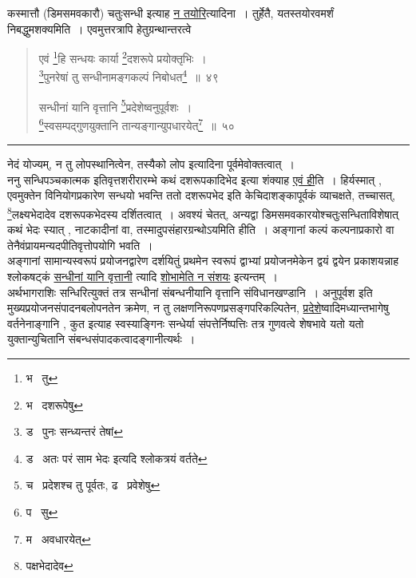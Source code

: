 \documentclass[11pt, openany]{book}
\begin{document}
कस्मात्तौ (डिमसमवकारौ) चतुःसन्धी इत्याह \underline{न तयोरि}त्यादिना~। तुर्हेतै, यतस्तयोरवमर्शं निबद्धुमशक्यमिति~। एवमुत्तरत्रापि हेतुग्रन्थान्तरत्वे \textendash

\newpage

\begin{quote}
{\na एवं \renewcommand{\thefootnote}{1}\footnote{भ \textendash\ तु}हि सन्धयः कार्या \renewcommand{\thefootnote}{2}\footnote{भ \textendash\ दशरूपेषु}दशरूपे प्रयोक्तृभिः~।\\
\renewcommand{\thefootnote}{3}\footnote{ड \textendash\ पुनः सन्ध्यन्तरं तेषां}पुनरेषां तु सन्धीनामङ्गकल्पं निबोधत\renewcommand{\thefootnote}{4}\footnote{ड \textendash\ अतः परं {\qt साम भेदः} इत्यदि श्लोकत्रयं वर्तते}~॥~४९

सन्धीनां यानि वृत्तानि \renewcommand{\thefootnote}{5}\footnote{च \textendash\ प्रदेशश्च तु पूर्वतः, ढ \textendash\ प्रवेशेषु}प्रदेशेष्वनुपूर्वशः~।\\
\renewcommand{\thefootnote}{6}\footnote{प \textendash\ सु}स्वसम्पद्गुणयुक्तानि तान्यङ्गान्युपधारयेत्\renewcommand{\thefootnote}{7}\footnote{म \textendash\ अवधारयेत्}~॥~५०}
\end{quote}

\hrule

\vspace{2mm}
\noindent
नेदं योज्यम्, न तु लोपस्थानित्वेन, तस्यैको लोप इत्यादिना पूर्वमेवोक्तत्वात्~।\\

ननु सन्धिपञ्चकात्मक इतिवृत्तशरीरारम्भे कथं दशरूपकादिभेद इत्या शंक्याह \underline{एवं ही}ति~। हिर्यस्मात् , एवमुक्तेन विनियोगप्रकारेण सन्धयो भवन्ति ततो दशरूपभेद इति केचिदाशङ्कापूर्वकं व्याचक्षते, तच्चासत्, \renewcommand{\thefootnote}{1}\footnote{पक्षभेदादेव}लक्ष्यभेदादेव दशरूपकभेदस्य दर्शितत्वात्~। अवश्यं चेतत्, अन्यद्वा डिमसमवकारयोश्चतुःसन्धिताविशेषात् कथं भेदः स्यात् , नाटकादीनां वा, तस्मादुपसंहारग्रन्थोऽयमिति हीति~। अङ्गानां कल्पं कल्पनाप्रकारो वा तेनैवंप्रायमन्यदपीतिवृत्तोपयोगि भवति~।\\

अङ्गानां सामान्यस्वरूपं प्रयोजनद्वारेण दर्शयितुं प्रथमेन स्वरूपं द्वाभ्यां प्रयोजनमेकेन द्वयं द्वयेन प्रकाशयन्नाह श्लोकषट्कं \underline{\qt सन्धीनां यानि वृत्तानी} त्यादि \underline{\qt शोभामेति न संशयः} इत्यन्तम्~।\\

अर्थभागराशिः सन्धिरित्युक्तं तत्र सन्धीनां संबन्धनीयानि वृत्तानि संविधानखण्डानि~। अनुपूर्वश इति मुख्यप्रयोजनसंपादनबलोपनतेन क्रमेण, न तु लक्षणनिरूपणप्रसङ्गपरिकल्पितेन, \underline{प्रदेशे}ष्वादिमध्यान्तभागेषु वर्तनेनाङ्गानि , कुत इत्याह स्वस्याङ्गिनः सन्धेर्या संपत्तेर्निष्पत्तिः तत्र गुणवत्वे शेषभावे यतो यतो युक्तान्युचितानि संबन्धसंपादकत्वादङ्गानीत्यर्थः~।
\end{document}
